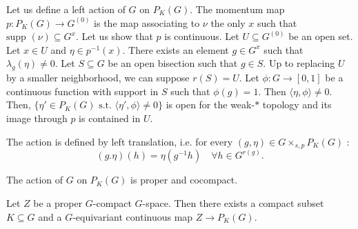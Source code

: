 Let us define a left action of $G$ on $P_K(G)$. The momentum map $p : P_K(G)\rightarrow G^{(0)}$ is the map associating to $\nu$ the only $x$ such that $\text{supp }(\nu) \subseteq G^x$. Let us show that $p$ is continuous. Let $U\subseteq G^{(0)}$ be an open set. Let $x\in U$ and $\eta\in p^{-1}(x)$. There exists an element $g\in G^x$ such that $\lambda_g(\eta) \neq 0$. Let $S\subseteq G$ be an open bisection such that $g\in S$. Up to replacing $U$ by a smaller neighborhood, we can suppose $r(S) = U$. Let $\phi : G \rightarrow [0,1]$ be a continuous function with support in $S$ such that $\phi(g) = 1$. Then $\langle \eta,\phi\rangle \neq 0$. Then, $\{\eta'\in P_K(G) \text{ s.t. }\langle \eta',\phi\rangle \neq 0 \}$ is open for the weak-$*$ topology and its image through $p$ is contained in $U$. 

The action is defined by left translation, i.e. for every $(g,\eta)\in G\times_{s,p}P_K(G)$ : 
\[(g.\eta)(h) = \eta(g^{-1}h)\quad \forall h\in G^{r(g)}.\]


\begin{lem}
The action of $G$ on $P_K(G)$ is proper and cocompact.
\end{lem}  

\begin{lem}\label{Gspace}
Let $Z$ be a proper $G$-compact $G$-space. Then there exists a compact subset $K\subseteq G$ and a $G$-equivariant continuous map $Z\rightarrow P_K(G)$.
\end{lem}  

